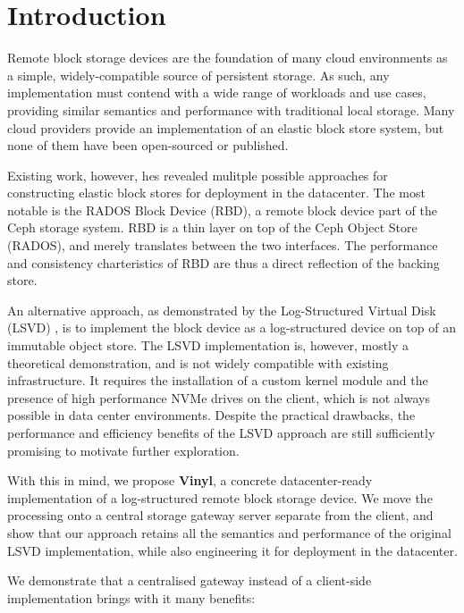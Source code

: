 \section{Introduction}

Remote block storage devices are the foundation of many cloud environments as a
simple, widely-compatible source of persistent storage. As such, any
implementation must contend with a wide range of workloads and use cases,
providing similar semantics and performance with traditional local storage.
Many cloud providers provide an implementation of an elastic block store system,
but none of them have been open-sourced or published.

Existing work, however, hes revealed mulitple possible approaches for
constructing elastic block stores for deployment in the datacenter. The most
notable is the RADOS Block Device (RBD), a remote block device part of the Ceph
storage system. RBD is a thin layer on top of the Ceph Object Store (RADOS), and
merely translates between the two interfaces. The performance and consistency
charteristics of RBD are thus a direct reflection of the backing store.

An alternative approach, as demonstrated by the Log-Structured Virtual Disk
(LSVD) \cite{lsvd}, is to implement the block device as a log-structured device
on top of an immutable object store. The LSVD implementation is, however, mostly
a theoretical demonstration, and is not widely compatible with existing
infrastructure. It requires the installation of a custom kernel module and the
presence of high performance NVMe drives on the client, which is not always
possible in data center environments. Despite the practical drawbacks, the
performance and efficiency benefits of the LSVD approach are still sufficiently
promising to motivate further exploration.

With this in mind, we propose  \textbf{Vinyl}, a
concrete datacenter-ready implementation of a log-structured remote block
storage device. We move the processing onto a central storage gateway server
separate from the client, and show that our approach retains all the semantics
and performance of the original LSVD implementation, while also engineering it
for deployment in the datacenter.

We demonstrate that a centralised gateway instead of a client-side
implementation brings with it many benefits:

